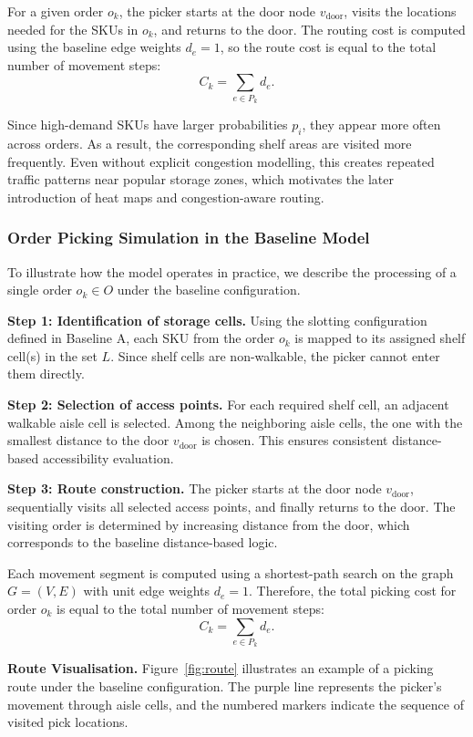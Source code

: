 \documentclass[12pt,a4paper]{article}
\begin{document}
For a given order $o_k$, the picker starts at the door node $v_\mathrm{door}$, visits the
locations needed for the SKUs in $o_k$, and returns to the door. The routing cost is computed
using the baseline edge weights $d_e = 1$, so the route cost is equal to the total number of
movement steps:
\[
  C_k = \sum_{e \in P_k} d_e.
\]

Since high-demand SKUs have larger probabilities $p_i$, they appear more often across
orders. As a result, the corresponding shelf areas are visited more frequently. Even without
explicit congestion modelling, this creates repeated traffic patterns near popular storage
zones, which motivates the later introduction of heat maps and congestion-aware routing.

\subsubsection{Order Picking Simulation in the Baseline Model}

To illustrate how the model operates in practice, we describe the processing of a single
order $o_k \in O$ under the baseline configuration.

\medskip
\noindent\textbf{Step 1: Identification of storage cells.}
Using the slotting configuration defined in Baseline A, each SKU from the order $o_k$ is
mapped to its assigned shelf cell(s) in the set $L$. Since shelf cells are non-walkable, the
picker cannot enter them directly.

\medskip
\noindent\textbf{Step 2: Selection of access points.}
For each required shelf cell, an adjacent walkable aisle cell is selected. Among the
neighboring aisle cells, the one with the smallest distance to the door $v_\mathrm{door}$ is
chosen. This ensures consistent distance-based accessibility evaluation.

\medskip
\noindent\textbf{Step 3: Route construction.}
The picker starts at the door node $v_\mathrm{door}$, sequentially visits all selected access
points, and finally returns to the door. The visiting order is determined by increasing
distance from the door, which corresponds to the baseline distance-based logic.

Each movement segment is computed using a shortest-path search on the graph $G = (V, E)$
with unit edge weights $d_e = 1$. Therefore, the total picking cost for order $o_k$ is equal
to the total number of movement steps:
\[
  C_k = \sum_{e \in P_k} d_e.
\]

\medskip
\noindent\textbf{Route Visualisation.}
Figure~\ref{fig:route} illustrates an example of a picking route under the baseline
configuration. The purple line represents the picker's movement through aisle cells,
and the numbered markers indicate the sequence of visited pick locations.
\end{document}
